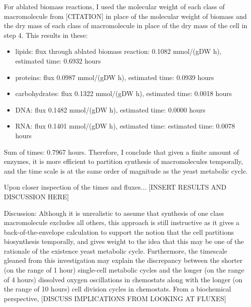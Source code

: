 For ablated biomass reactions, I used the molecular weight of each class of macromolecule from [CITATION] in place of the molecular weight of biomass and the dry mass of each class of macromolecule in place of the dry mass of the cell in step 4.
This results in these:
\begin{itemize}
  \item lipids: flux through ablated biomass reaction: 0.1082 mmol/(gDW h), estimated time: 0.6932 hours
  \item proteins: flux 0.0987 mmol/(gDW h), estimated time: 0.0939 hours
  \item carbohydrates: flux 0.1322 mmol/(gDW h), estimated time: 0.0018 hours
  \item DNA: flux 0.1482 mmol/(gDW h), estimated time: 0.0000 hours
  \item RNA: flux 0.1401 mmol/(gDW h), estimated time: estimated time: 0.0078 hours
\end{itemize}
Sum of times: 0.7967 hours.
Therefore, I conclude that given a finite amount of enzymes, it is more efficient to partition synthesis of macromolecules temporally, and the time scale is at the same order of magnitude as the yeast metabolic cycle.

Upon closer inspection of the times and fluxes... [INSERT RESULTS AND DISCUSSION HERE]

Discussion: Although it is unrealistic to assume that synthesis of one class macromolecule excludes all others, this approach is still instructive as it gives a back-of-the-envelope calculation to support the notion that the cell partitions biosynthesis temporally, and gives weight to the idea that this may be one of the rationale of the existence yeast metabolic cycle.
Furthermore, the timescale gleaned from this investigation may explain the discrepancy between the shorter (on the range of 1 hour) single-cell metabolic cycles and the longer (on the range of 4 hours) dissolved oxygen oscillations in chemostats along with the longer (on the range of 10 hours) cell division cycles in chemostats.
From a biochemical perspective, [DISCUSS IMPLICATIONS FROM LOOKING AT FLUXES]

